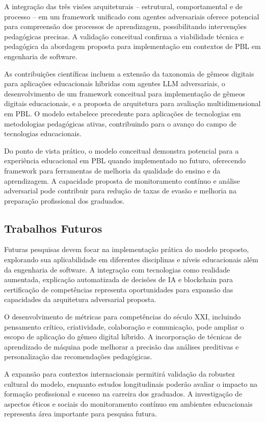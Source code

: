 \documentclass[english, spanish, brazilian]{modelo_dt}
\begin{document}
A integração das três visões arquiteturais -- estrutural, comportamental e de processo -- em um framework unificado com agentes adversariais oferece potencial para compreensão dos processos de aprendizagem, possibilitando intervenções pedagógicas precisas\@. A validação conceitual confirma a viabilidade técnica e pedagógica da abordagem proposta para implementação em contextos de PBL em engenharia de software\@.

As contribuições científicas incluem a extensão da taxonomia de gêmeos digitais para aplicações educacionais híbridas com agentes LLM adversariais, o desenvolvimento de um framework conceitual para implementação de gêmeos digitais educacionais, e a proposta de arquitetura para avaliação multidimensional em PBL\@. O modelo estabelece precedente para aplicações de tecnologias em metodologias pedagógicas ativas, contribuindo para o avanço do campo de tecnologias educacionais\@.

Do ponto de vista prático, o modelo conceitual demonstra potencial para a experiência educacional em PBL quando implementado no futuro, oferecendo framework para ferramentas de melhoria da qualidade do ensino e da aprendizagem\@. A capacidade proposta de monitoramento contínuo e análise adversarial pode contribuir para redução de taxas de evasão e melhoria na preparação profissional dos graduados\@.

\subsection{Trabalhos Futuros}

Futuras pesquisas devem focar na implementação prática do modelo proposto, explorando sua aplicabilidade em diferentes disciplinas e níveis educacionais além da engenharia de software\@. A integração com tecnologias como realidade aumentada, explicação automatizada de decisões de IA e blockchain para certificação de competências representa oportunidades para expansão das capacidades da arquitetura adversarial proposta\@.

O desenvolvimento de métricas para competências do século XXI, incluindo pensamento crítico, criatividade, colaboração e comunicação, pode ampliar o escopo de aplicação do gêmeo digital híbrido\@. A incorporação de técnicas de aprendizado de máquina pode melhorar a precisão das análises preditivas e personalização das recomendações pedagógicas\@.

A expansão para contextos internacionais permitirá validação da robustez cultural do modelo, enquanto estudos longitudinais poderão avaliar o impacto na formação profissional e sucesso na carreira dos graduados\@. A investigação de aspectos éticos e sociais do monitoramento contínuo em ambientes educacionais representa área importante para pesquisa futura\@.
\end{document}

